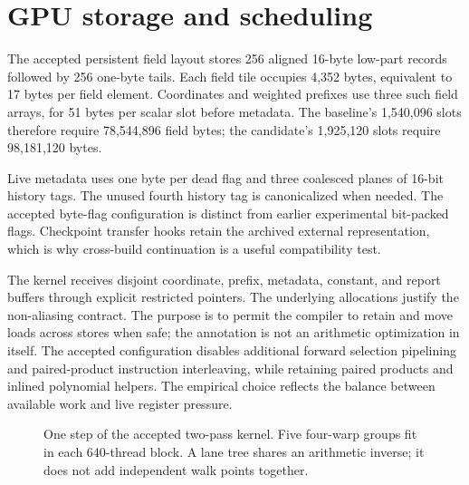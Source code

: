 \documentclass[11pt,a4paper]{article}
\begin{document}
\section{GPU storage and scheduling}
The accepted persistent field layout stores 256 aligned 16-byte low-part records followed by 256 one-byte tails. Each field tile occupies 4,352 bytes, equivalent to 17 bytes per field element. Coordinates and weighted prefixes use three such field arrays, for 51 bytes per scalar slot before metadata. The baseline's 1,540,096 slots therefore require 78,544,896 field bytes; the candidate's 1,925,120 slots require 98,181,120 bytes.

Live metadata uses one byte per dead flag and three coalesced planes of 16-bit history tags. The unused fourth history tag is canonicalized when needed. The accepted byte-flag configuration is distinct from earlier experimental bit-packed flags. Checkpoint transfer hooks retain the archived external representation, which is why cross-build continuation is a useful compatibility test.

The kernel receives disjoint coordinate, prefix, metadata, constant, and report buffers through explicit restricted pointers. The underlying allocations justify the non-aliasing contract. The purpose is to permit the compiler to retain and move loads across stores when safe; the annotation is not an arithmetic optimization in itself. The accepted configuration disables additional forward selection pipelining and paired-product instruction interleaving, while retaining paired products and inlined polynomial helpers. The empirical choice reflects the balance between available work and live register pressure.

\begin{figure}[t]
\centering
{}
\caption{One step of the accepted two-pass kernel. Five four-warp groups fit in each 640-thread block. A lane tree shares an arithmetic inverse; it does not add independent walk points together.}
\label{fig:architecture}
\end{figure}
\end{document}
